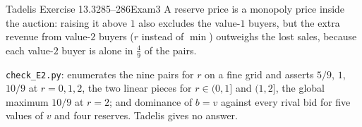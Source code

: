 \begin{exsol}{Tadelis Exercise 13.3}{285--286}{Exam}{3}
\interp A reserve price is a monopoly price inside the auction: raising it above $1$ also excludes
the value-$1$ buyers, but the extra revenue from value-$2$ buyers ($r$ instead of $\min$) outweighs
the lost sales, because each value-$2$ buyer is alone in $\tfrac49$ of the pairs.

\verify \texttt{check\_E2.py}: enumerates the nine pairs for $r$ on a fine grid and asserts
$5/9$, $1$, $10/9$ at $r=0,1,2$, the two linear pieces for $r\in(0,1]$ and $(1,2]$, the global maximum
$10/9$ at $r=2$; and dominance of $b=v$ against every rival bid for five values of $v$ and four
reserves. Tadelis gives no answer.

\end{exsol}
